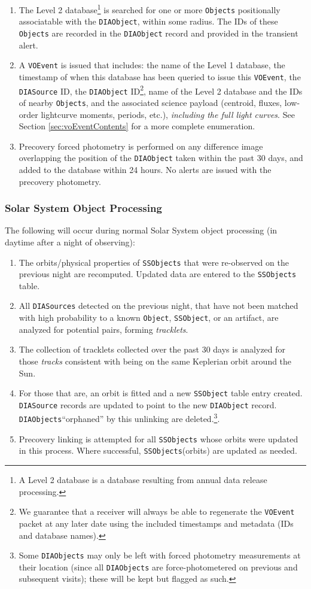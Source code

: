 \documentclass[12pt]{article}
\newcommand{\code}[1]{\texttt{#1}}
\newcommand{\DIASource}{\code{DIASource}\xspace}
\newcommand{\DIASources}{\code{DIASources}\xspace}
\newcommand{\DIAObject}{\code{DIAObject}\xspace}
\newcommand{\DIAObjects}{\code{DIAObjects}\xspace}
\newcommand{\DB}{{Level 1 database}\xspace}
\newcommand{\DR}{{Level 2 database}\xspace}
\newcommand{\Object}{\code{Object}\xspace}
\newcommand{\Objects}{\code{Objects}\xspace}
\newcommand{\SSObject}{\code{SSObject}\xspace}
\newcommand{\SSObjects}{\code{SSObjects}\xspace}
\newcommand{\VOEvent}{\code{VOEvent}\xspace}
\begin{document}
\begin{enumerate}
\item The \DR\footnote{A \DR is a database resulting from annual data release processing.} is searched for one or more \Objects positionally associatable with the \DIAObject, within some radius. The IDs of these \Objects are recorded in the \DIAObject record and provided in the transient alert.
\item A \VOEvent is issued that includes: the name of the \DB, the timestamp of when this database has been queried to issue this \VOEvent, the \DIASource ID, the \DIAObject ID\footnote{We guarantee that a receiver will always be able to regenerate the \VOEvent packet at any later date using the included timestamps and metadata (IDs and database names).}, name of the \DR and the IDs of nearby \Objects, and the associated science payload (centroid, fluxes, low-order lightcurve moments, periods, etc.), {\em including the full light curves}. See Section \ref{sec:voEventContents} for a more complete enumeration.
\item Precovery forced photometry is performed on any difference image overlapping the position of the \DIAObject taken within the past 30 days, and added to the database within 24 hours. No alerts are issued with the precovery photometry.
\end{enumerate}

\subsubsection{Solar System Object Processing}
\label{sec:ssProcessing}

The following will occur during normal Solar System object processing (in daytime after a night of observing):
\begin{enumerate}
\item The orbits/physical properties of \SSObjects that were re-observed on the previous night are recomputed. Updated data are entered to the \SSObjects table.
\item All \DIASources detected on the previous night, that have not been matched with high probability to a known \Object, \SSObject, or an artifact, are analyzed for potential pairs, forming {\em tracklets}.
\item The collection of tracklets collected over the past 30 days is analyzed for those {\em tracks} consistent with being on the same Keplerian orbit around the Sun.
\item For those that are, an orbit is fitted and a new \SSObject table entry created. \DIASource records are updated to point to the new \DIAObject record. \DIAObjects ``orphaned'' by this unlinking are deleted.\footnote{Some \DIAObjects may only be left with forced photometry measurements at their location (since all \DIAObjects are force-photometered on previous and subsequent visits);  these will be kept but flagged as such.}.
\item Precovery linking is attempted for all \SSObjects whose orbits were updated in this process. Where successful, \SSObjects (orbits) are updated as needed.
\end{enumerate}
\end{document}
